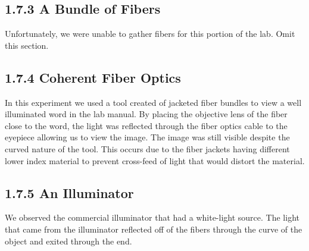 \documentclass[12pt, oneside]{article}   	%
\begin{document}
\subsection*{1.7.3 A Bundle of Fibers}
Unfortunately, we were unable to gather fibers for this portion of the lab. Omit this section.

\subsection*{1.7.4 Coherent Fiber Optics}
In this experiment we used a tool created of jacketed fiber bundles to view a well illuminated word in the lab manual. 
By placing the objective lens of the fiber close to the word, the light was reflected through the fiber optics cable to the eyepiece allowing us to view the image.
The image was still visible despite the curved nature of the tool. 
This occurs due to the fiber jackets having different lower index material to prevent cross-feed of light that would distort the material.

\subsection*{1.7.5 An Illuminator}
We observed the commercial illuminator that had a white-light source.
The light that came from the illuminator reflected off of the fibers through the curve of the object and exited through the end.
\end{document}

